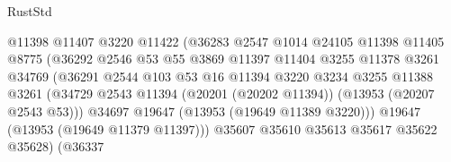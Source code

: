 \begin{lexlean}{RustStd}
\begin{coremodule}
                                        @11398
                                        @11407
                                        @3220
                                        @11422
                                        (@36283
                                          @2547
                                          @1014
                                          @24105
                                          @11398
                                          @11405
                                          @8775
                                          (@36292
                                            @2546
                                            @53
                                            @55
                                            @3869
                                            @11397
                                            @11404
                                            @3255
                                            @11378
                                            @3261
                                            @34769
                                            (@36291
                                              @2544
                                              @103
                                              @53
                                              @16
                                              @11394
                                              @3220
                                              @3234
                                              @3255
                                              @11388
                                              @3261
                                              (@34729
                                                @2543
                                                @11394
                                                (@20201 (@20202 @11394))
                                                (@13953 (@20207 @2543 @53)))
                                              @34697
                                              @19647
                                              (@13953 (@19649 @11389 @3220)))
                                            @19647
                                            (@13953 (@19649 @11379 @11397)))
                                          @35607
                                          @35610
                                          @35613
                                          @35617
                                          @35622
                                          @35628)
                                        (@36337

\end{coremodule}
\end{lexlean}
